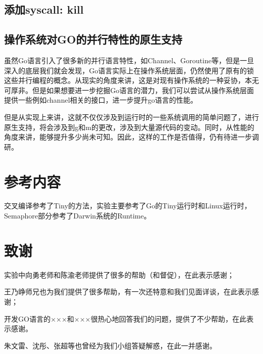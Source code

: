 \documentclass{article}
\begin{document}
\subsection{添加syscall: kill}

\subsection{操作系统对GO的并行特性的原生支持}
虽然Go语言引入了很多新的并行语言特性，如Channel、Goroutine等，但是一旦深入的底层我们就会发现，Go语言实际上在操作系统层面，仍然使用了原有的锁这些并行编程的概念。从现实的角度来讲，这是对现有操作系统的一种妥协，本无可厚非。但是如果想要进一步挖掘Go语言的潜力，我们可以尝试从操作系统层面提供一些例如channel相关的接口，进一步提升go语言的性能。

但是从实现上来讲，这就不仅仅涉及到运行时的一些系统调用的简单问题了，进行原生支持，将会涉及到g和m的更改，涉及到大量源代码的变动。同时，从性能的角度来讲，能够提升多少尚未可知。因此，这样的工作是否值得，仍有待进一步调研。

\section{参考内容}

交叉编译参考了Tiny的方法，实验主要参考了Go的Tiny运行时和Linux运行时，Semaphore部分参考了Darwin系统的Runtime。

\section{致谢}
实验中向勇老师和陈渝老师提供了很多的帮助（和督促），在此表示感谢；

王乃峥师兄也为我们提供了很多帮助，有一次还特意和我们见面详谈，在此表示感谢；

开发GO语言的×××和×××很热心地回答我们的问题，提供了不少帮助，在此表示感谢。

朱文雷、沈彤、张超等也曾经为我们小组答疑解惑，在此一并感谢。
\end{document}

